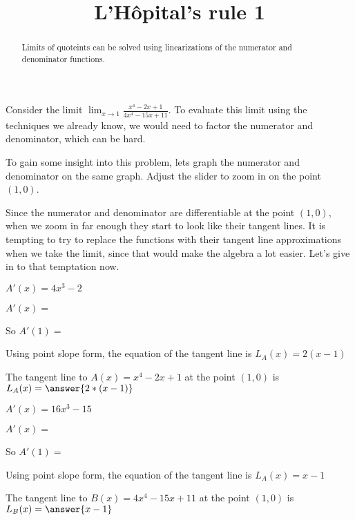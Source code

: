 \documentclass{ximera}
\title[ Dig-In:]{L'H\^{o}pital's rule 1}
\begin{document}
\begin{abstract}
   Limits of quoteints can be solved using linearizations of the numerator and denominator functions.
\end{abstract}

Consider the limit \(\displaystyle\lim_{x \to 1} \frac{x^4-2x+1}{4x^4 - 15x +11}\).  To evaluate this limit using the 
techniques we already know, we would need to factor the numerator and denominator, which can be hard.

To gain some insight into this problem, lets graph the numerator and denominator on the same graph. Adjust the slider
to zoom in on the point $(1,0)$.


Since the numerator and denominator are differentiable at the point $(1,0)$, 
when we zoom in far enough they start to look like their tangent lines.  It is tempting to try to replace the functions
with their tangent line approximations when we take the limit, since that would make the algebra a lot easier.  Let's
give in to that temptation now.

\begin{question}
  \begin{hint}
      \begin{hint}
        $A'(x) = 4x^3-2$
      \end{hint}
      $A'(x)=$
  \end{hint}
  \begin{hint}
    So $A'(1)=$
  \end{hint}
  \begin{hint}
    Using point slope form, the equation of the tangent line is $L_A(x) = 2(x-1)$
  \end{hint}
  
  The tangent line to $A(x) = x^4-2x+1$ at the point $(1,0)$ is $L_A(x) =\answer{2*(x-1)}$
\end{question}

\begin{question}
\begin{hint}
      \begin{hint}
        $A'(x) = 16x^3-15$
      \end{hint}
      $A'(x)=$
  \end{hint}
  \begin{hint}
    So $A'(1)=$
  \end{hint}
  \begin{hint}
    Using point slope form, the equation of the tangent line is $L_A(x) = x-1$
  \end{hint}
  The tangent line to $B(x) = 4x^4-15x+11$ at the point $(1,0)$ is $ L_B(x)= \answer{x-1}$
\end{question}
\end{document}

